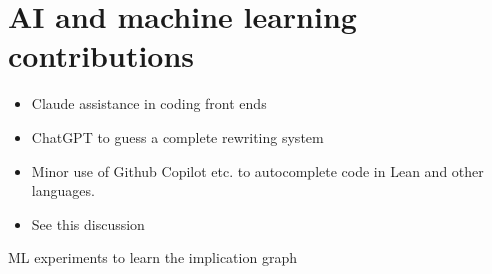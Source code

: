 \section{AI and machine learning contributions}


\begin{itemize}
\item Claude assistance in coding front ends
\item ChatGPT to guess a complete rewriting system
\item Minor use of Github Copilot etc. to autocomplete code in Lean and other languages.
\item See this discussion
\end{itemize}

ML experiments to learn the implication graph
